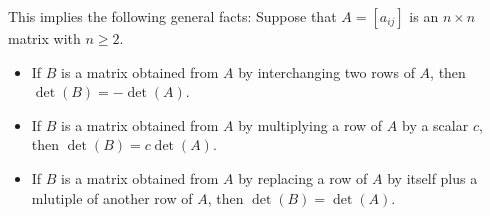 \documentclass[12pt,a4paper]{article}
\begin{document}
	\noindent This implies the following general facts:
	Suppose that $A = [a_{ij}]$ is an $n \times n$ matrix with $n \geq 2$.
		\begin{itemize}
		\item If $B$ is a matrix obtained from $A$ by interchanging two rows of $A$, then $\det (B) = - \det (A)$.
		\item If $B$ is a matrix obtained from $A$ by multiplying a row of $A$ by a scalar $c$, then $\det (B) = c \det (A)$.
		\item If $B$ is a matrix obtained from $A$ by replacing a row of $A$ by itself plus a mlutiple of another row of $A$, then $\det (B) = \det (A)$. 
		\end{itemize}
\end{document}
